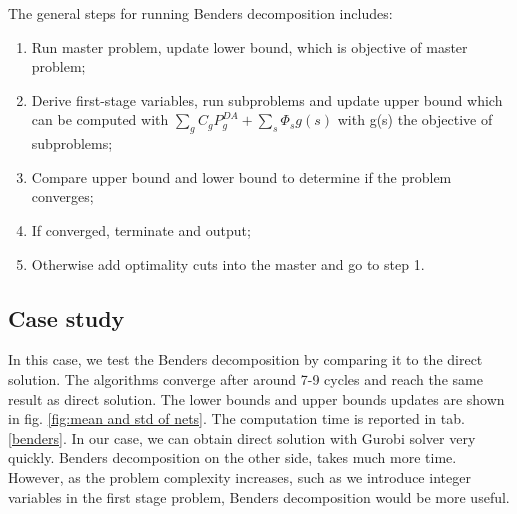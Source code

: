 The general steps for running Benders decomposition includes:
\begin{enumerate}
    \item Run master problem, update lower bound, which is objective of master problem;
    \item Derive first-stage variables, run subproblems and update upper bound which can be computed with $\sum_g C_gP_g^{DA}+\sum_s \Phi_s g(s)$ with g(s) the objective of subproblems;
    \item Compare upper bound and lower bound to determine if the problem converges;
    \item If converged, terminate and output;
    \item Otherwise add optimality cuts into the master and go to step 1.
\end{enumerate}

\subsection{Case study}
In this case, we test the Benders decomposition by comparing it to the direct solution. The algorithms converge after around 7-9 cycles and reach the same result as direct solution. The lower bounds and upper bounds updates are shown in fig. \ref{fig:mean and std of nets}. The computation time is reported in tab. \ref{benders}. In our case, we can obtain direct solution with Gurobi solver very quickly. Benders decomposition on the other side, takes much more time. However, as the problem complexity increases, such as we introduce integer variables in the first stage problem, Benders decomposition would be more useful.

